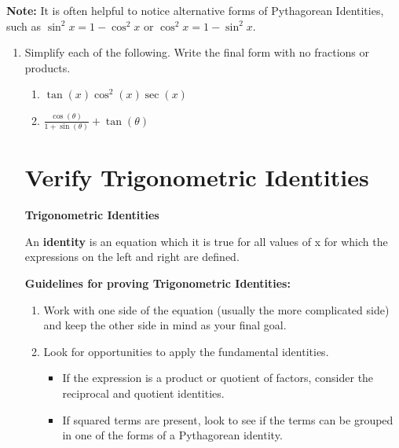 \documentclass[11pt]{article}
\newcommand{\boxcolor}{gray!30}
\newenvironment{boxthm}{\begin{mdframed}[backgroundcolor=\boxcolor,nobreak=true]}{\end{mdframed}}
\begin{document}
{\bf Note:} It is often helpful to notice alternative forms of Pythagorean Identities, such as $\sin^2 x = 1-\cos^2 x$ or $\cos^2 x = 1-\sin^2 x$.




\begin{enumerate}
\vspace{-.1in}
\item Simplify each of the following. Write the final form with no fractions or products.

\begin{enumerate}
\item $\tan(x) \cos^2(x) \sec(x)$
\vfill


\newpage

\item $\displaystyle \frac{\cos (\theta)}{1+\sin (\theta)}+\tan (\theta)$
\vfill


\end{enumerate}

\section{Verify Trigonometric Identities}
\begin{boxthm}
{\bf Trigonometric Identities}

An {\bf identity} is an equation which it is true for all values of x for which the expressions on the left and right are defined.

\vspace{0.5cm}

{\bf Guidelines for proving Trigonometric Identities:}
\begin{enumerate}
\item Work with one side of the equation (usually the more complicated side) and keep the other side in mind as your final goal.

\item Look for opportunities to apply the fundamental identities.

\begin{itemize}

\item If the expression is a product or quotient of factors, consider the reciprocal and quotient identities.

\item If squared terms are present, look to see if the terms can be grouped in one of the forms of a Pythagorean identity.


\end{itemize}
\end{enumerate}
\end{boxthm}
\end{enumerate}
\end{document}
